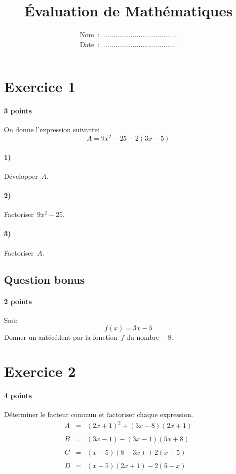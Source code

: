 \documentclass[a4paper]{article}
\begin{document}
  \title{Évaluation de Mathématiques}
  \date{
    Nom~: .......................................\\
    \vspace{0.2cm}
    Date~: .......................................}
  \maketitle

  \section*{Exercice 1}
  \paragraph{3 points}
  On donne l'expression suivante:
  \[
    A = 9 x^2 - 25 - 2(3x - 5)
  \]
  \paragraph{1)} Développer~$A$.
  \paragraph{2)} Factoriser~$9 x^2 - 25$.
  \paragraph{3)} Factoriser~$A$.

  \subsection*{Question bonus}
  \paragraph{2 points}
  Soit:
  \[
    f(x) = 3x - 5
  \]
  Donner un antécédent par la fonction~$f$ du nombre~$-8$.

  \section*{Exercice 2}
  \paragraph{4 points}
  Déterminer le facteur commun et factoriser chaque expression.
  \[
    \begin{array}{rcl}
      A &=& (2x + 1)^2 + (3x - 8) (2x + 1)\\\\
      B &=& (3x - 1) - (3x - 1)(5x + 8)\\\\
      C &=& (x + 5)(8 - 3x) + 2(x + 5)\\\\
      D &=& (x - 5)(2x + 1) - 2(5 - x)
    \end{array}
  \]
\end{document}
